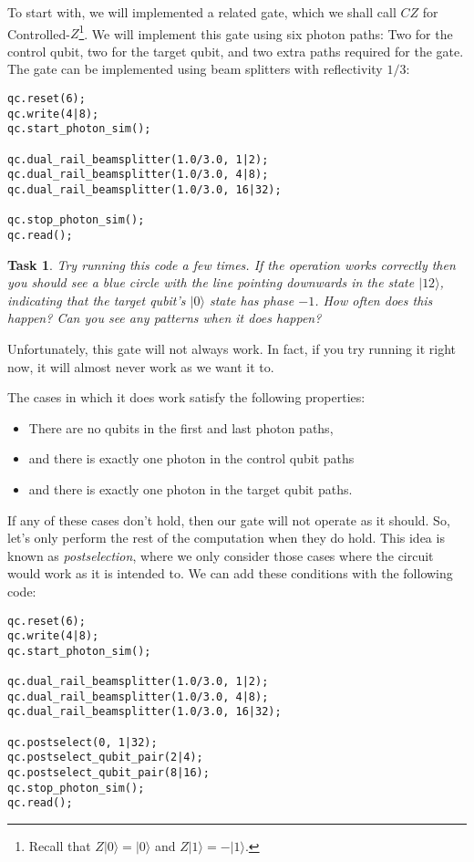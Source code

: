 \documentclass[twocolumn]{article}
\newtheorem{task}{Task}[section]
\begin{document}
To start with, we will implemented a related gate, which we shall call $CZ$ for Controlled-$Z$\footnote{Recall that $Z|0\rangle = |0\rangle$ and $Z|1\rangle = -|1\rangle$.}. We will implement this gate using six photon paths: Two for the control qubit, two for the target qubit, and two extra paths required for the gate. The gate can be implemented using beam splitters with reflectivity $1/3$:

\begin{lstlisting}
qc.reset(6);
qc.write(4|8);
qc.start_photon_sim();

qc.dual_rail_beamsplitter(1.0/3.0, 1|2);
qc.dual_rail_beamsplitter(1.0/3.0, 4|8);
qc.dual_rail_beamsplitter(1.0/3.0, 16|32);

qc.stop_photon_sim();
qc.read();
\end{lstlisting}

\begin{task}
Try running this code a few times. If the operation works correctly then you should see a blue circle with the line pointing downwards in the state $|12\rangle$, indicating that the target qubit's $|0\rangle$ state has phase $-1$. How often does this happen? Can you see any patterns when it does happen?
\end{task}

Unfortunately, this gate will not always work. In fact, if you try running it right now, it will almost never work as we want it to.

The cases in which it does work satisfy the following properties:

\begin{itemize}
\item There are no qubits in the first and last photon paths,
\item and there is exactly one photon in the control qubit paths
\item and there is exactly one photon in the target qubit paths.
\end{itemize}

If any of these cases don't hold, then our gate will not operate as it should. So, let's only perform the rest of the computation when they do hold. This idea is known as {\em postselection}, where we only consider those cases where the circuit would work as it is intended to. We can add these conditions with the following code:

\begin{lstlisting}
qc.reset(6);
qc.write(4|8);
qc.start_photon_sim();

qc.dual_rail_beamsplitter(1.0/3.0, 1|2);
qc.dual_rail_beamsplitter(1.0/3.0, 4|8);
qc.dual_rail_beamsplitter(1.0/3.0, 16|32);

qc.postselect(0, 1|32);
qc.postselect_qubit_pair(2|4);
qc.postselect_qubit_pair(8|16);
qc.stop_photon_sim();
qc.read();
\end{lstlisting}
\end{document}
